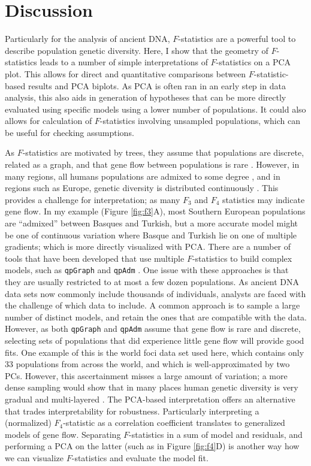 \documentclass[12pt,fullpage, a4paper]{article}
\begin{document}
\section{Discussion}
Particularly for the analysis of ancient DNA, $F$-statistics  are  a powerful tool to describe population genetic diversity. Here, I show that the geometry of $F$-statistics \citep{oteo-garcia2021} leads to a number of simple interpretations of $F$-statistics on a PCA plot. This allows for direct and quantitative comparisons between $F$-statistic-based results and PCA biplots. As PCA is often ran in an early step in data analysis, this also aids in generation of hypotheses that can be more directly evaluated using specific models using a lower number of populations. It could also allows for calculation of $F$-statistics involving unsampled populations, which can be useful for checking assumptions. 

As $F$-statistics are motivated by trees, they assume that populations are discrete, related as a graph, and that gene flow between populations is rare \citep{patterson2012,harney2021}. 
However, in many regions, all humans populations are admixed to some degree \citep{pickrell2014}, and in regions such as Europe, genetic diversity is distributed continuously \citep{novembre2008}. This provides a challenge for interpretation; as many $F_3$ and $F_4$ statistics may indicate gene flow. In my example (Figure \ref{fig:f3}A), most Southern European populations are ``admixed'' between Basques and Turkish, but a more accurate model might be one of continuous variation where Basque and Turkish lie on one of multiple gradients; which is more directly visualized with PCA. There are a number of tools that have been developed that use multiple $F$-statistics to build complex models, such as \texttt{qpGraph} \citep{lazaridis2014} and \texttt{qpAdm} \citep{harney2021}. One issue with these approaches is that they are usually restricted to at most a few dozen populations. As ancient DNA data sets now commonly include thousands of individuals, analysts are faced with the challenge of which data to include. A common approach is to sample a large number of distinct models, and retain the ones that are compatible with the data. However, as both \texttt{qpGraph} and \texttt{qpAdm} assume that gene flow is rare and discrete, selecting sets of populations that did experience little gene flow will provide good fits. One example of this is the world foci data set used here, which contains only 33 populations from across the world, and which is well-approximated by two PCs. However, this ascertainment misses a large amount of variation; a more dense sampling would show that in many places human genetic diversity is very gradual and multi-layered \citep{lazaridis2014, peter2020a}. The PCA-based  interpretation offers an alternative that trades interpretability for robustness. Particularly interpreting a (normalized) $F_4$-statistic as a correlation coefficient translates to generalized models of gene flow. Separating $F$-statistics in a sum of model and residuals, and performing a PCA on the latter (such as in Figure \ref{fig:f4}D)  is another way how we can visualize $F$-statistics and evaluate the model fit.
\end{document}
